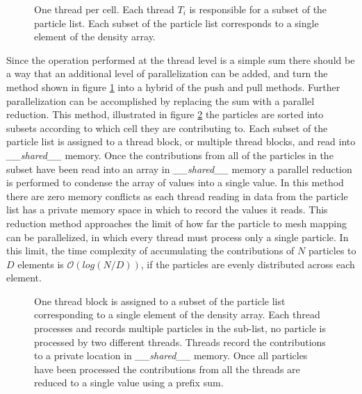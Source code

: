 \begin{figure}
\begin{center}

\end{center}
\caption[One thread per cell]{One thread per cell. Each thread $T_i$ is responsible for a subset of the particle list. Each subset of the particle list corresponds to a single element of the density array.}
\label{fig:one_thread_per_cell}
\end{figure}

Since the operation performed at the thread level is a simple sum there should be a way that an additional level of parallelization can be added, and turn the method shown in figure \ref{fig:one_thread_per_cell} into a hybrid of the push and pull methods. Further parallelization can be accomplished by replacing the sum with a parallel reduction. This method, illustrated in figure \ref{fig:one_cell_per_block} the particles are sorted into subsets according to which cell they are contributing to. Each subset of the particle list is assigned to a thread block, or multiple thread blocks, and read into \emph{\_\_shared\_\_} memory. Once the contributions from all of the particles in the subset have been read into an array in \emph{\_\_shared\_\_} memory a parallel reduction is performed to condense the array of values into a single value. In this method there are zero memory conflicts as each thread reading in data from the particle list has a private memory space in which to record the values it reads. 
This reduction method approaches the limit of how far the particle to mesh mapping can be parallelized, in which every thread must process only a single particle. In this limit, the time complexity of accumulating the contributions of $N$ particles to $D$ elements is $\mathcal{O}(log(N/D))$, if the particles are evenly distributed across each element. 

\begin{figure}
\begin{center}

\end{center}
\caption[One thread block per cell]{One thread block is assigned to a subset of the particle list corresponding to a single element of the density array. Each thread processes and records multiple particles in the sub-list, no particle is processed by two different threads. Threads record the contributions to a private location in \emph{\_\_shared\_\_} memory. Once all particles have been processed the contributions from all the threads are reduced to a single value using a prefix sum.}
\label{fig:one_cell_per_block}
\end{figure}




